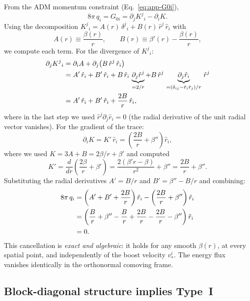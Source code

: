 \documentclass[11pt]{article}
\begin{document}
From the ADM momentum constraint (Eq.~\eqref{eq:app-G0i}),
\begin{equation}
8\pi\,q_i = G_{0i} = \partial_j K^j{}_i - \partial_i K.
\end{equation}
Using the decomposition $K^j{}_i = A(r)\,\delta^j{}_i + B(r)\,\hat r^j\,\hat r_i$ with
\begin{equation}
A(r) \equiv \frac{\beta(r)}{r}, \qquad B(r) \equiv \beta'(r) - \frac{\beta(r)}{r},
\end{equation}
we compute each term. For the divergence of $K^j{}_i$:
\begin{align}
\partial_j K^j{}_i &= \partial_i A + \partial_j\bigl(B\,\hat r^j\,\hat r_i\bigr) \notag\\
&= A'\,\hat r_i + B'\,\hat r_i + B\,\hat r_i\,\underbrace{\partial_j \hat r^j}_{= 2/r} + B\,\hat r^j\,\underbrace{\partial_j \hat r_i}_{= (\delta_{ij} - \hat r_i \hat r_j)/r}\,\hat r^j \notag\\
&= A'\,\hat r_i + B'\,\hat r_i + \frac{2B}{r}\,\hat r_i,
\end{align}
where in the last step we used $\hat r^j \partial_j \hat r_i = 0$ (the radial derivative of the unit radial vector vanishes). For the gradient of the trace:
\begin{equation}
\partial_i K = K'\,\hat r_i = \left(\frac{2B}{r} + \beta''\right)\hat r_i,
\end{equation}
where we used $K = 3A + B = 2\beta/r + \beta'$ and computed
\begin{equation}
K' = \frac{d}{dr}\!\left(\frac{2\beta}{r} + \beta'\right) = \frac{2(\beta'r - \beta)}{r^2} + \beta'' = \frac{2B}{r} + \beta''.
\end{equation}
Substituting the radial derivatives $A' = B/r$ and $B' = \beta'' - B/r$ and combining:
\begin{align}
8\pi\,q_i &= \left(A' + B' + \frac{2B}{r}\right)\hat r_i - \left(\frac{2B}{r} + \beta''\right)\hat r_i \notag\\
&= \left(\frac{B}{r} + \beta'' - \frac{B}{r} + \frac{2B}{r} - \frac{2B}{r} - \beta''\right)\hat r_i \notag\\
&= 0.
\end{align}
This cancellation is \emph{exact and algebraic}: it holds for any smooth $\beta(r)$, at every spatial point, and independently of the boost velocity $v_*^i$. The energy flux vanishes identically in the orthonormal comoving frame.

\subsection{Block-diagonal structure implies Type~I}
\end{document}
